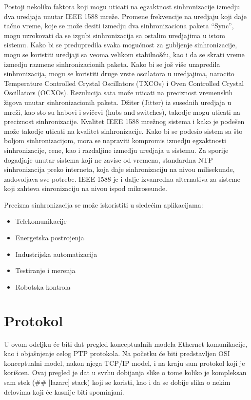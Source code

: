 \documentclass[a4paper,12pt, master]{etf}
\begin{document}
	Postoji nekoliko faktora koji mogu uticati na egzaktnost sinhronizacije izmedju dva
	uredjaja unutar IEEE 1588 mre\v{z}e. Promene frekvencije na uredjaju koji daje ta\v{c}no vreme,
	koje se mo\v{z}e desiti izmedju dva sinhronizaciona paketa ``Sync'', mogu uzrokovati da se
	izgubi sinhronizacija sa ostalim uredjajima u istom sistemu. Kako bi se predupredila
	svaka mogu\'{c}nost za gubljenje sinhronizacije, mogu se koristiti uredjaji sa veoma velikom
	stabilno\v{s}\'{c}u, kao i da se skrati vreme izmedju razmene sinhronizacionih paketa. Kako bi
	se jo\v{s} vi\v{s}e unapredila sinhronizacija, mogu se koristiti druge vrste oscilatora u
	uredjajima, narocito Temperature Controlled Crystal Oscillators (TXCOs) i Oven Controlled Crystal
	Oscillators (OCXOs). Rezulucija sata mo\v{z}e uticati na preciznost vremenskih \v{z}igova unutar
	sinhronizacionih paketa. D\v{z}iter (Jitter) iz susednih uredjaja u mre\v{z}i, kao sto su habovi i
	svi\v{c}evi (hubs and switches), takodje mogu uticati na preciznost sinhronizacije. Kvalitet IEEE 1588
	mre\v{z}nog sistema i kako je pode\v{s}en mo\v{z}e takodje uticati na kvalitet sinhronizacije. Kako bi
	se podesio sistem sa \v{s}to boljom sinhronizacijom, mora se napraviti kompromis izmedju
	egzaktnosti sinhronizacije, cene, kao i razdaljine izmedju uredjaja u sistemu. Za sporije
	dogadjaje unutar sistema koji ne zavise od vremena, standardna NTP sinhronizacija preko
	interneta, koja daje sinhronizaciju na nivou milisekunde, zadovoljava sve potrebe. IEEE
	1588 je i dalje izvanredna alternativa za sisteme koji zahteva sinronizaciju na nivou ispod
	mikroseunde.

	Precizna sinhronizacija se mo\v{z}e iskoristiti u slede\'{c}im aplikacijama:
	\begin{itemize}
		\item Telekomunikacije
		\item Energetska postrojenja
		\item Industrijska automatizacija
		\item Testiranje i merenja
		\item Robotska kontrola
	\end{itemize}

	\newpage

        \chapter{Protokol}

        U ovom odeljku \'{c}e biti dat pregled konceptualnih modela Ethernet komunikacije, kao i obja\v{s}njenje
        celog PTP protokola. Na po\v{c}etku \'{c}e biti predstavljen OSI konceptualni model, nakon njega TCP/IP
        model, i na kraju sam protokol koji je kori\v{s}cen. Ovaj pregled je dat u svrhu dobijanja slike o tome
        koliko je kompleksan sam stek (\#\# [lazarc] stack) koji se koristi, kao i da se dobije slika o nekim
        delovima koji \'{c}e kasnije biti spominjani.
\end{document}
